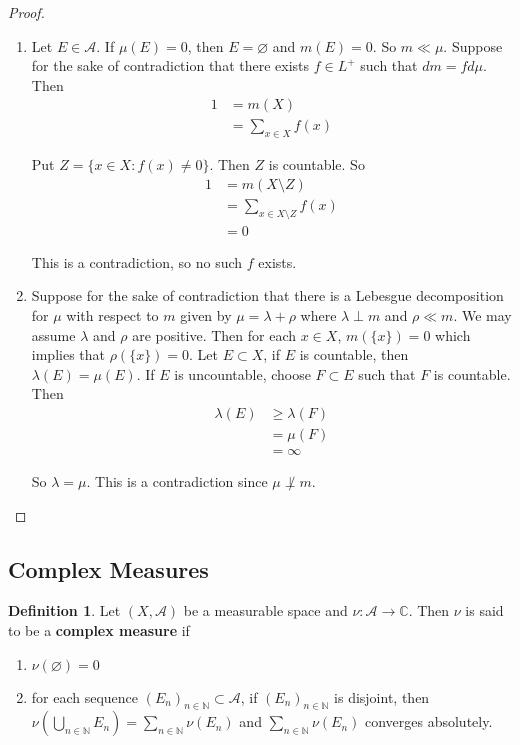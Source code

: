 \documentclass[12pt]{amsart}
\theoremstyle{definition}
\newtheorem{defn}[definition]{Definition}
\newcommand{\lam}{\lambda}
\newcommand{\C}{\mathbb{C}}
\newcommand{\N}{\mathbb{N}}
\newcommand{\MA}{\mathcal{A}}
\begin{document}
	\begin{proof}
		\begin{enumerate}
			\item Let $E \in \MA$. If $\mu(E) = 0$, then $E = \varnothing$ and $m(E) = 0$. So $m \ll \mu$. Suppose for the sake of contradiction that there exists $f \in L^+$ such that $dm = f d\mu$. Then 
			\begin{align*}
				1
				&= m(X) \\
				&= \sum_{x \in X} f(x)
			\end{align*}
			
			Put $Z = \{x \in X: f(x) \neq 0 \}$. Then $Z$ is countable. So 
			\begin{align*}
				1
				&= m(X \setminus Z) \\
				&= \sum_{x \in X \setminus Z} f(x)\\
				&= 0
			\end{align*}
			
			This is a contradiction, so no such $f$ exists.
			
			\item Suppose for the sake of contradiction that there is a Lebesgue decomposition for $\mu$ with respect to $m$ given by $\mu = \lam + \rho$ where $\lam \perp m$ and $\rho \ll m$. We may assume $\lam$ and $\rho$ are positive. Then for each $x \in X$, $m(\{x\})=0$ which implies that $\rho(\{x\}) = 0$. Let $E \subset X$, if $E$ is countable, then $\lam(E) = \mu(E)$. If $E$ is uncountable, choose $F \subset E$ such that $F$ is countable. Then 
			\begin{align*}
				\lam(E) 
				& \geq \lam(F) \\
				& = \mu(F) \\
				&= \infty
			\end{align*}
			
			So $\lam = \mu$. This is a contradiction since $\mu \not \perp m$.
		\end{enumerate}
	\end{proof}
	
	\subsection{Complex Measures}
	
	\begin{defn}
		Let $(X, \MA)$ be a measurable space and $\nu:\MA \rightarrow \C$. Then $\nu$ is said to be a \textbf{complex measure} if 
		\begin{enumerate}
			\item $\nu (\varnothing) = 0$
			\item for each sequence $(E_n)_{n \in \N} \subset \MA$, if $(E_n)_{n \in \N}$ is disjoint, then $\nu(\bigcup_{n \in \N} E_n) = \sum_{n \in \N} \nu(E_n)$ and $\sum_{n \in \N} \nu(E_n)$ converges absolutely. 
		\end{enumerate}
	\end{defn}
	
\end{document}

